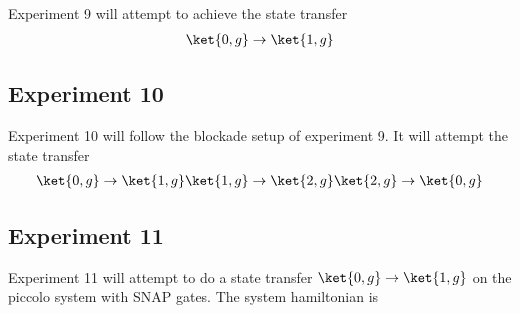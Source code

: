 \documentclass[letterpaper, 12pt]{article}
\begin{document}
Experiment 9 will attempt to achieve the state transfer
\begin{align*}
  \ket{0, g} \rightarrow \ket{1, g}
\end{align*}

\subsection{Experiment 10}
Experiment 10 will follow the blockade setup of experiment 9. It will
attempt the state transfer
\begin{align*}
  \ket{0, g} \rightarrow \ket{1, g}
  \ket{1, g} \rightarrow \ket{2, g}
  \ket{2, g} \rightarrow \ket{0, g}
\end{align*}

\subsection{Experiment 11}
Experiment 11 will attempt to do a state transfer $\ket{0, g} \rightarrow \ket{1, g}$
on the piccolo system with SNAP gates. The system hamiltonian is



\end{document}
